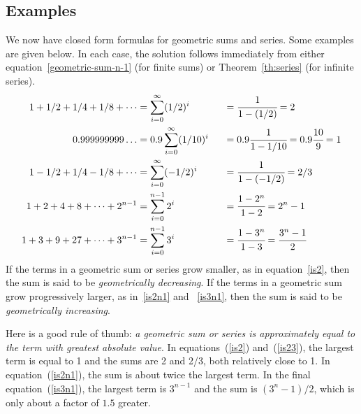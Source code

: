 \begin{editingnotes}

\subsection*{Examples}

We now have closed form formulas for geometric sums and series.  Some
examples are given below.  In each case, the solution follows immediately
from either equation~\eqref{geometric-sum-n-1} (for finite sums) or
Theorem~\ref{th:series} (for infinite series).
\begin{alignat}{3}
1 + 1/2 + 1/4 + 1/8 + \cdots &=\sum_{i=0}^\infty (1/2)^i
                             &\;\;&=\cfrac{1}{1-(1/2)}
                               =2 \label{is2}
\\
0.999999999\dots             &=0.9 \sum_{i=0}^{\infty} (1/10)^i
                             &&=0.9\cfrac{1}{1-1/10}
                               =0.9\cfrac{10}{9} 
                               =1 \label{is1}
\\
1 - 1/2 + 1/4 - 1/8 + \cdots &=\sum_{i=0}^\infty (-1/2)^i
                             &&=\cfrac{1}{1-(-1/2)}
                               =2/3 \label{is23}
\\
1 + 2 + 4 + 8 + \cdots + 2^{n-1} &=\sum_{i=0}^{n-1} 2^i
                                 &&=\cfrac{1 - 2^n}{1 - 2}
                                   =2^n - 1 \label{is2n1}
\\
1 + 3 + 9 + 27 + \cdots + 3^{n-1} &=\sum_{i=0}^{n-1} 3^i
                                  &&=\cfrac{1 - 3^n}{1 - 3}
                                    =\cfrac{3^n - 1}{2} \label{is3n1}
\end{alignat}
If the terms in a geometric sum or series grow smaller, as in
equation~\eqref{is2}, then the sum is said to be {\em geometrically
decreasing}.  If the terms in a geometric sum grow progressively larger,
as in~\eqref{is2n1} and ~\eqref{is3n1}, then the sum is said to be {\em
geometrically increasing}.

Here is a good rule of thumb: {\em a geometric sum or series is
approximately equal to the term with greatest absolute value}.  In
equations~(\ref{is2}) and~(\ref{is23}), the largest term is equal to 1 and
the sums are 2 and 2/3, both relatively close to 1.  In
equation~(\ref{is2n1}), the sum is about twice the largest term.  In the
final equation~(\ref{is3n1}), the largest term is $3^{n-1}$ and the sum is
$(3^n-1)/2$, which is only about a factor of $1.5$ greater.



\end{editingnotes}
